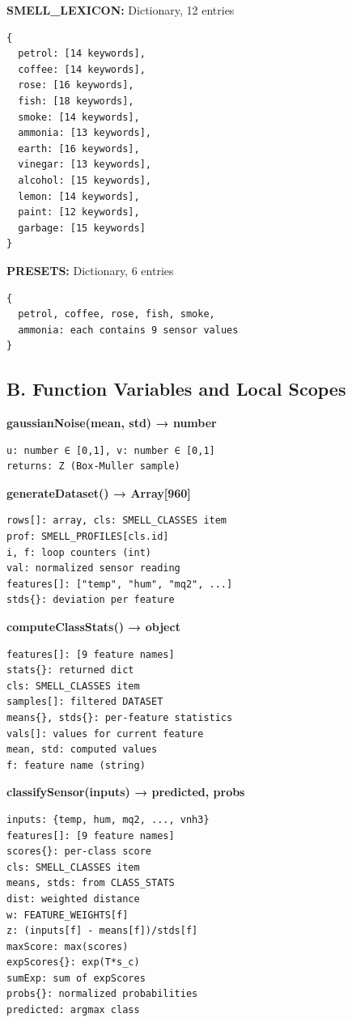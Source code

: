 \documentclass[10pt]{article}
\begin{document}
{\textbf{SMELL\_LEXICON:} Dictionary, 12 entries
\begin{verbatim}
{
  petrol: [14 keywords],
  coffee: [14 keywords],
  rose: [16 keywords],
  fish: [18 keywords],
  smoke: [14 keywords],
  ammonia: [13 keywords],
  earth: [16 keywords],
  vinegar: [13 keywords],
  alcohol: [15 keywords],
  lemon: [14 keywords],
  paint: [12 keywords],
  garbage: [15 keywords]
}
\end{verbatim}

\textbf{PRESETS:} Dictionary, 6 entries
\begin{verbatim}
{
  petrol, coffee, rose, fish, smoke,
  ammonia: each contains 9 sensor values
}
\end{verbatim}

\subsection*{B. Function Variables and Local Scopes}

\textbf{gaussianNoise(mean, std) → number}
\begin{verbatim}
u: number ∈ [0,1], v: number ∈ [0,1]
returns: Z (Box-Muller sample)
\end{verbatim}

\textbf{generateDataset() → Array[960]}
\begin{verbatim}
rows[]: array, cls: SMELL_CLASSES item
prof: SMELL_PROFILES[cls.id]
i, f: loop counters (int)
val: normalized sensor reading
features[]: ["temp", "hum", "mq2", ...]
stds{}: deviation per feature
\end{verbatim}

\textbf{computeClassStats() → object}
\begin{verbatim}
features[]: [9 feature names]
stats{}: returned dict
cls: SMELL_CLASSES item
samples[]: filtered DATASET
means{}, stds{}: per-feature statistics
vals[]: values for current feature
mean, std: computed values
f: feature name (string)
\end{verbatim}

\textbf{classifySensor(inputs) → {predicted, probs}}
\begin{verbatim}
inputs: {temp, hum, mq2, ..., vnh3}
features[]: [9 feature names]
scores{}: per-class score
cls: SMELL_CLASSES item
means, stds: from CLASS_STATS
dist: weighted distance
w: FEATURE_WEIGHTS[f]
z: (inputs[f] - means[f])/stds[f]
maxScore: max(scores)
expScores{}: exp(T*s_c)
sumExp: sum of expScores
probs{}: normalized probabilities
predicted: argmax class
\end{verbatim}

}
\end{document}
